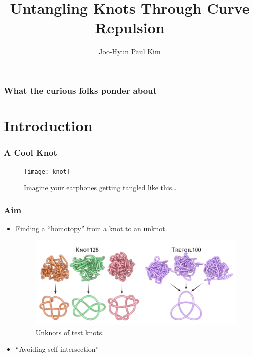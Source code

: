 \documentclass{beamer}
\title{Untangling Knots Through Curve Repulsion}
\author{Joo-Hyun Paul Kim}
\theoremstyle{remark}
\begin{document}
\begin{frame}
    \titlepage
\end{frame}

\begin{frame}
    \frametitle{What the curious folks ponder about}
    \tableofcontents
\end{frame}

\section{Introduction}
\begin{frame}
    \frametitle{A Cool Knot}
    \begin{figure}[h]
        \centering
        \texttt{[image: knot]}
        \caption{Imagine your earphones getting tangled like this\ldots}
    \end{figure}
\end{frame}


\begin{frame}
    \frametitle{Aim}
    \begin{itemize}
        \item<1-> Finding a ``homotopy'' from a knot to an unknot.
            \begin{figure}[h]
                \centering
                \includegraphics[scale=0.2]{knotsolving}
                \caption{Unknots of test knots.\cite{YSC2021}}
            \end{figure}
        \item<2-> ``Avoiding self-intersection''
    \end{itemize}
\end{frame}
\end{document}
